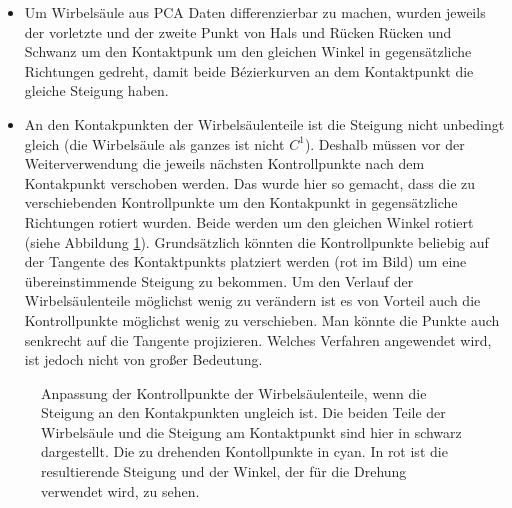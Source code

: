 \begin{itemize}
 \item Um Wirbelsäule aus PCA Daten differenzierbar zu machen, wurden jeweils der vorletzte und der zweite Punkt von Hals und Rücken \bzw Rücken und Schwanz um den Kontaktpunk um den gleichen Winkel in gegensätzliche Richtungen gedreht, damit beide Bézierkurven an dem Kontaktpunkt die gleiche Steigung haben. 
 \item An den Kontakpunkten der Wirbelsäulenteile ist die Steigung nicht unbedingt gleich (die Wirbelsäule als ganzes ist nicht $C^1$). Deshalb müssen vor der Weiterverwendung die jeweils nächsten Kontrollpunkte nach dem Kontakpunkt verschoben werden. Das wurde hier so gemacht, dass die zu verschiebenden Kontrollpunkte um den Kontakpunkt in gegensätzliche Richtungen rotiert wurden. Beide werden um den gleichen Winkel rotiert (siehe Abbildung \ref{smooth_spine}). Grundsätzlich könnten die Kontrollpunkte beliebig auf der Tangente des Kontaktpunkts platziert werden (rot im Bild) um eine übereinstimmende Steigung zu bekommen. Um den Verlauf der Wirbelsäulenteile möglichst wenig zu verändern ist es von Vorteil auch die Kontrollpunkte möglichst wenig zu verschieben. Man könnte die Punkte \zb auch senkrecht auf die Tangente projizieren. Welches Verfahren angewendet wird, ist jedoch nicht von großer Bedeutung. 
\end{itemize}

\begin{figure}
 \qquad
 \caption{Anpassung der Kontrollpunkte der Wirbelsäulenteile, wenn die Steigung an den Kontakpunkten ungleich ist. Die beiden Teile der Wirbelsäule und die Steigung am Kontaktpunkt sind hier in schwarz dargestellt. Die zu drehenden Kontollpunkte in cyan. In rot ist die resultierende Steigung und der Winkel, der für die Drehung verwendet wird, zu sehen.}
 \label{smooth_spine}
\end{figure}


